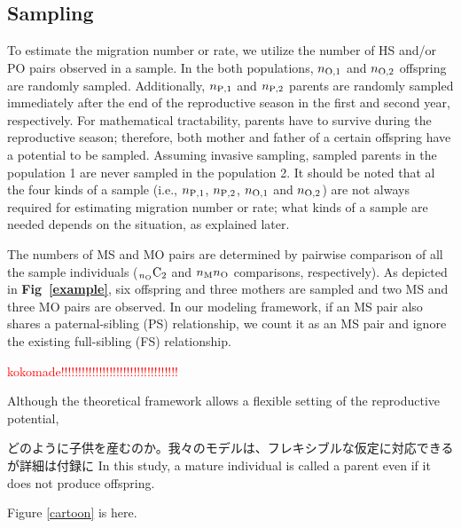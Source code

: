 \documentclass[12pt, English]{article}
\begin{document}
\begin{spacing}{1.9}
\subsection{Sampling}

To estimate the migration number or rate, we utilize the number of HS and/or PO pairs observed in a sample. In the both populations, $n_{\rm O, 1}$ and $n_{\rm O, 2}$ offspring are randomly sampled. Additionally, $n_{\rm P, 1}$ and $n_{\rm P, 2}$ parents are randomly sampled immediately after the end of the reproductive season in the first and second year, respectively. For mathematical tractability, parents have to survive during the reproductive season; therefore, both mother and father of a certain offspring have a potential to be sampled. Assuming invasive sampling, sampled parents in the population 1 are never sampled in the population 2. It should be noted that al the four kinds of a sample (i.e., $n_{\rm P, 1}$, $n_{\rm P, 2}$, $n_{\rm O, 1}$ and $n_{\rm O, 2}$) are not always required for estimating migration number or rate; what kinds of a sample are needed depends on the situation, as explained later. 

 The numbers of MS and MO pairs are determined by pairwise comparison of all the sample individuals (${}_{n_{\rm O}}\mathrm{C}_2$ and $n_{\rm M}n_{\rm O}$ comparisons, respectively). As depicted in {\bf Fig~\ref{example}}, six offspring and three mothers are sampled and two MS and three MO pairs are observed. In our modeling framework, if an MS pair also shares a paternal-sibling (PS) relationship, we count it as an MS pair and ignore the existing full-sibling (FS) relationship. 

\textcolor{red}{kokomade!!!!!!!!!!!!!!!!!!!!!!!!!!!!!!!!!!}







Although the theoretical framework allows a flexible setting of the reproductive potential, 





どのように子供を産むのか。我々のモデルは、フレキシブルな仮定に対応できるが詳細は付録に
In this study, a mature individual is called a parent even if it does not produce offspring. 



\begin{center}
Figure \ref{cartoon} is here. 
\end{center}





\end{spacing}
\end{document}
